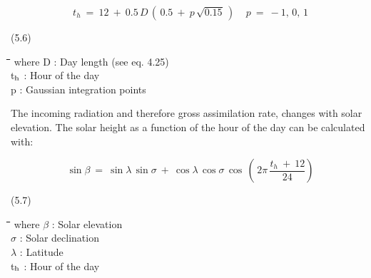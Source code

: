 \documentclass[11pt]{article}
\begin{document}
\begin{displaymath}
t _{h} ~=~ 12 ~+~ 0.5\, D\, (\, 0.5 ~+~ p\, \sqrt{0.15} \, )~~~~~p~=~-1,\, 0,\, 1
\end{displaymath}

 \bigskip
\strut\hfill (5.6)
\nwln
\begin{tabbing}
\hspace{1.27cm}\=\hspace{1.27cm}\=\hspace{1.27cm}\=\hspace{1.27cm}\=%
\hspace{1.27cm}\=\hspace{1.27cm}\=\hspace{1.27cm}\=\hspace{1.27cm}\=%
\hspace{1.27cm}\=\hspace{1.27cm}\=\kill
where\> D\> : Day length (see eq. 4.25)\> \> \> \> \> \> \> \> [h]\\
\>t$_{{\rm h}}$\> : Hour of the day\> \> \> \> \> \> \> \> [h]\\
\>p\> : Gaussian integration points\> \> \> \> \> \> \> \> [-]
\end{tabbing}

\bigskip
\bigskip
The incoming radiation and therefore gross assimilation rate, changes with solar eleva\-tion. The solar height as a function of the hour of the day can be calculated with:

\begin{displaymath}
\sin \beta ~=~ \sin \lambda \, \sin \sigma ~+~ \cos \lambda \, \cos \sigma \, \cos \, (\, 2 \pi \,{\frac{t _{h} ~+~ 12}{24}} )
\end{displaymath}

\bigskip
\strut\hfill (5.7)
\nwln
\begin{tabbing}
\hspace{1.27cm}\=\hspace{1.27cm}\=\hspace{1.27cm}\=\hspace{1.27cm}\=%
\hspace{1.27cm}\=\hspace{1.27cm}\=\hspace{1.27cm}\=\hspace{1.27cm}\=%
\hspace{1.27cm}\=\hspace{1.27cm}\=\kill
where\> $\beta$\> : Solar elevation\> \> \> \> \> \> \> \> [degrees]\\
\>$\sigma$\> : Solar declination\> \> \> \> \> \> \> \> [degrees]\\
\>$\lambda$\> : Latitude\> \> \> \> \> \> \> \> [degrees]\\
\>t$_{{\rm h}}$\> : Hour of the day\> \> \> \> \> \> \> \> [h]
\end{tabbing}
\end{document}
